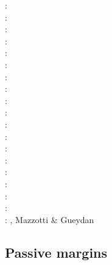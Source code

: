 \begin{scriptsize}
\nineteenseventyfive: \cite{fouy75}\cite{sosr75}\\
\nineteenseventysix: \cite{riss76}\\
\nineteenseventyseven: \cite{chtu77}\\
\nineteenseventynine: \cite{riss79}\\
\nineteeneightynine: \cite{boww89}\\
\nineteenninetyone: \cite{worg91}\\
\nineteenninetytwo: \cite{rich92}\cite{wuvr92}\cite{zoba92}\cite{clko92}\\
\twothousandone: \cite{stsm01}\\
\twothousandfour: \cite{ligu04}\\
\twothousandfive: \cite{timr05}\\
\twothousandseven: \cite{hert07}\\
\twothousandeight: \cite{bilr08}\cite{ghhw08}\\
\twothousandnine: \cite{ghhf09}\cite{nacl09}\\
\twothousandten: \cite{bepo10}\cite{yosh10}\\
\twothousandtwelve: \cite{nalr12}\cite{ghho12}\cite{wagw12}\\
\twothousandthirteen: \cite{ghhw13}\cite{wagw13}\\
\twothousandfourteen: \cite{vagw14}\\
\twothousandseventeen: \cite{grrb17}\\
\twothousandeighteen: \cite{osss18}, Mazzotti \& Gueydan \cite{magu18}
\end{scriptsize}

\subsection{Passive margins} 

